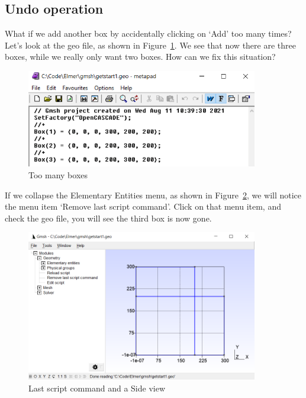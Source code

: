 \subsection{Undo operation}

What if we add another box by accidentally clicking on `Add' too many times?  Let's look at the geo file, as shown in Figure~\ref{fg:gmsh-15}.  We see that now there are three boxes, while we really only want two boxes.  How can we fix this situation?  

\begin{figure}[H]
\centering
\includegraphics[width=0.9\textwidth]{gmsh-15}
\caption{Too many boxes}\label{fg:gmsh-15}
\end{figure}

If we collapse the Elementary Entities menu, as shown in Figure~\ref{fg:gmsh-16}, we will notice the menu item `Remove last script command'.  Click on that menu item, and check the geo file, you will see the third box is now gone.

\begin{figure}[H]
\centering
\includegraphics[width=0.9\textwidth]{gmsh-16}
\caption{Last script command and a Side view}\label{fg:gmsh-16}
\end{figure}

\newpage

